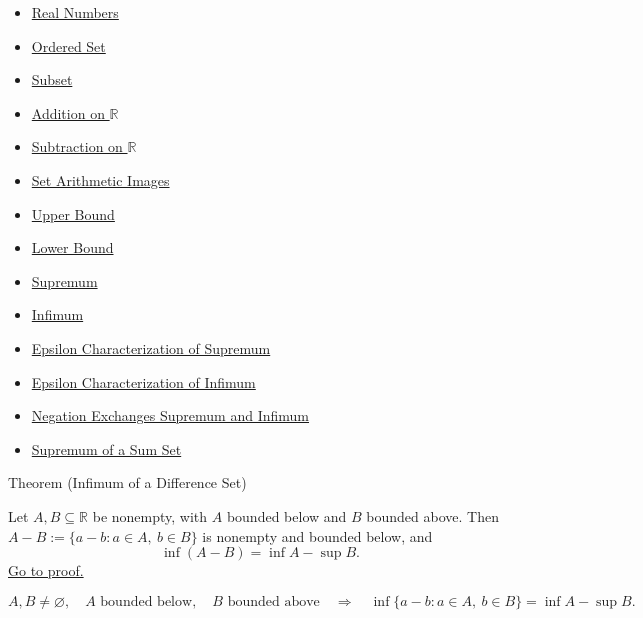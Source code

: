 \begin{dependencies}
\begin{itemize}
  \item \hyperref[def:reals]{Real Numbers}
  \item \hyperref[def:ordered-set]{Ordered Set}
  \item \hyperref[def:subset]{Subset}
  \item \hyperref[def:addition-on-r]{Addition on $\mathbb{R}$}
  \item \hyperref[def:subtraction-on-r]{Subtraction on $\mathbb{R}$}
  \item \hyperref[def:set-arithmetic-images]{Set Arithmetic Images}
  \item \hyperref[def:real-upper-bound]{Upper Bound}
  \item \hyperref[def:real-lower-bound]{Lower Bound}
  \item \hyperref[def:supremum]{Supremum}
  \item \hyperref[def:infimum]{Infimum}
  \item \hyperref[def:epsilon-characterization-of-supremum]{Epsilon Characterization of Supremum}
  \item \hyperref[def:epsilon-characterization-of-infimum]{Epsilon Characterization of Infimum}
  \item \hyperref[thm:negation-exchange-sup-inf]{Negation Exchanges Supremum and Infimum}
  \item \hyperref[thm:supremum-sum-set]{Supremum of a Sum Set}
\end{itemize}
\end{dependencies}

\begin{theorembox}{Theorem (Infimum of a Difference Set)}
\begin{theorem}
\label{thm:infimum-difference-set}
Let $A,B\subseteq\mathbb{R}$ be nonempty, with $A$ bounded below and $B$
bounded above.  Then $A-B:=\{a-b:a\in A,\ b\in B\}$ is nonempty and bounded
below, and
\[
  \inf(A-B)=\inf A-\sup B.
\]
\hyperref[prf:infimum-difference-set]{Go to proof.}
\end{theorem}
\end{theorembox}

\begin{remark*}
\[
A,B\neq\varnothing,\quad A\text{ bounded below},\quad B\text{ bounded above}
\quad\Longrightarrow\quad
\inf\{a-b:a\in A,\ b\in B\}=\inf A-\sup B.
\]
\end{remark*}

